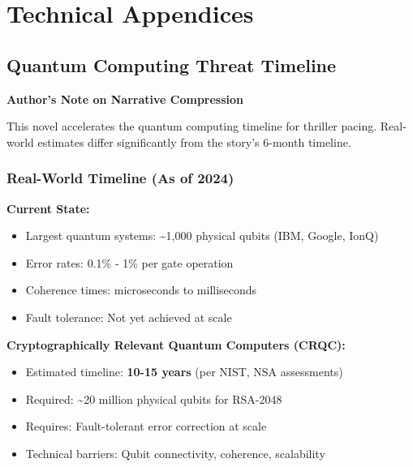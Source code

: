 \documentclass[12pt,oneside]{book}
\begin{document}


\newpage



\newpage



\newpage
\appendix

\chapter{Technical Appendices}

\section{Quantum Computing Threat Timeline}

\begin{technote}
\textbf{Author's Note on Narrative Compression}

This novel accelerates the quantum computing timeline for thriller pacing. Real-world estimates differ significantly from the story's 6-month timeline.
\end{technote}

\subsection{Real-World Timeline (As of 2024)}

\textbf{Current State:}
\begin{itemize}
\item Largest quantum systems: \textasciitilde1,000 physical qubits (IBM, Google, IonQ)
\item Error rates: 0.1\% - 1\% per gate operation
\item Coherence times: microseconds to milliseconds
\item Fault tolerance: Not yet achieved at scale
\end{itemize}

\textbf{Cryptographically Relevant Quantum Computers (CRQC):}
\begin{itemize}
\item Estimated timeline: \textbf{10-15 years} (per NIST, NSA assessments)
\item Required: \textasciitilde20 million physical qubits for RSA-2048
\item Requires: Fault-tolerant error correction at scale
\item Technical barriers: Qubit connectivity, coherence, scalability
\end{itemize}
\end{document}
